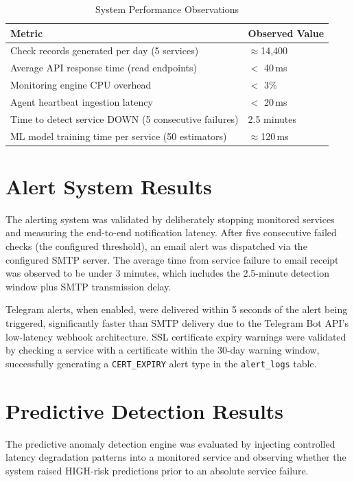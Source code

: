 \documentclass[12pt,a4paper,oneside]{report}
\begin{document}
\begin{table}[H]
\centering
\begin{tabularx}{\textwidth}{|X|l|}
\hline
\textbf{Metric} & \textbf{Observed Value} \\
\hline
Check records generated per day (5 services) & $\approx$14,400 \\
\hline
Average API response time (read endpoints) & $<$ 40\,ms \\
\hline
Monitoring engine CPU overhead & $<$ 3\% \\
\hline
Agent heartbeat ingestion latency & $<$ 20\,ms \\
\hline
Time to detect service DOWN (5 consecutive failures) & 2.5 minutes \\
\hline
ML model training time per service (50 estimators) & $\approx$120\,ms \\
\hline
\end{tabularx}
\caption{System Performance Observations}
\label{tab:performance}
\end{table}

\section{Alert System Results}
\noindent The alerting system was validated by deliberately stopping monitored services and measuring the end-to-end notification latency. After five consecutive failed checks (the configured threshold), an email alert was dispatched via the configured SMTP server. The average time from service failure to email receipt was observed to be under 3 minutes, which includes the 2.5-minute detection window plus SMTP transmission delay.

\noindent Telegram alerts, when enabled, were delivered within 5 seconds of the alert being triggered, significantly faster than SMTP delivery due to the Telegram Bot API's low-latency webhook architecture. SSL certificate expiry warnings were validated by checking a service with a certificate within the 30-day warning window, successfully generating a \texttt{CERT\_EXPIRY} alert type in the \texttt{alert\_logs} table.

\section{Predictive Detection Results}
\noindent The predictive anomaly detection engine was evaluated by injecting controlled latency degradation patterns into a monitored service and observing whether the system raised HIGH-risk predictions prior to an absolute service failure.
\end{document}
